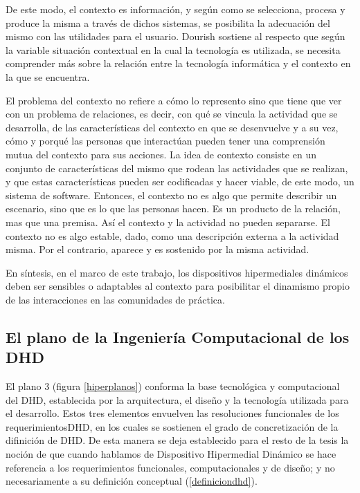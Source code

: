 De este modo, el contexto es información, y según como se selecciona, procesa y
produce la misma a través de dichos sistemas, se posibilita la adecuación del
mismo con las utilidades para el usuario. Dourish sostiene al respecto que según
la variable situación contextual en la cual la tecnología es utilizada, se
necesita comprender más sobre la relación entre la tecnología informática y el
contexto en la que se encuentra.

El problema del contexto no refiere a cómo lo represento sino que tiene
que ver con un problema de relaciones, es decir, con qué se vincula la
actividad que se desarrolla, de las características del contexto en que se
desenvuelve y a su vez, cómo y porqué las personas que interactúan pueden
tener una comprensión mutua del contexto para sus acciones. La idea de
contexto consiste en un conjunto de características del mismo que rodean las
actividades que se realizan, y que estas características pueden ser codificadas
y hacer viable, de este modo, un sistema de software. Entonces, el contexto no
es algo que permite describir un escenario, sino que es lo que las personas
hacen. Es un producto de la relación, mas que una premisa. Así el contexto y la
actividad no pueden separarse. El contexto no es algo estable, dado, como una
descripción externa a la actividad misma. Por el contrario, aparece y es
sostenido por la misma actividad.

En síntesis, en el marco de este trabajo, los dispositivos hipermediales
dinámicos deben ser sensibles o adaptables al contexto para posibilitar el
dinamismo propio de las interacciones en las comunidades de práctica.


\subsection{El plano de la Ingeniería Computacional de los DHD} \label{plano3}

El plano 3 (figura \ref{hiperplanos}) conforma la base tecnológica y
computacional del DHD, establecida por la arquitectura, el diseño y la
tecnología utilizada para el desarrollo. Estos tres elementos envuelven las
resoluciones funcionales de los requerimientosDHD, en los cuales se sostienen el
grado de concretización de la difinición de DHD. De esta manera se deja
establecido para el resto de la tesis la noción de que cuando hablamos de
Dispositivo Hipermedial Dinámico se hace referencia a los requerimientos
funcionales, computacionales y de diseño; y no necesariamente a su definición
conceptual (\ref{definiciondhd}).

